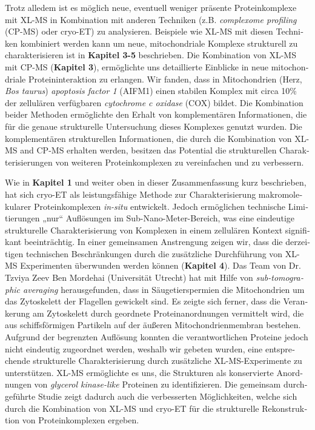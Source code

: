 \begin{otherlanguage}{german}
    Trotz alledem ist es möglich neue, eventuell weniger präsente Proteinkomplexe mit XL-MS in Kombination mit anderen Techniken (z.B. \emph{complexome profiling} (CP-MS) oder cryo-ET) zu analysieren. Beispiele wie XL-MS mit diesen Techniken kombiniert werden kann um neue, mitochondriale Komplexe strukturell zu charakterisieren ist in \textbf{Kapitel 3-5} beschrieben.
    Die Kombination von XL-MS mit CP-MS (\textbf{Kapitel 3}), ermöglichte uns detaillierte Einblicke in neue mitochondriale Proteininteraktion zu erlangen. Wir fanden, dass in Mitochondrien (Herz, \emph{Bos taurus}) \emph{apoptosis factor 1} (AIFM1) einen stabilen Komplex mit circa 10\% der zellulären verfügbaren \emph{cytochrome c oxidase} (COX) bildet. Die Kombination beider Methoden ermöglichte den Erhalt von komplementären Informationen, die für die genaue strukturelle Untersuchung dieses Komplexes genutzt wurden. Die komplementären strukturellen Informationen, die durch die Kombination von XL-MS and CP-MS erhalten werden, besitzen das Potential die strukturellen Charakterisierungen von weiteren Proteinkomplexen zu vereinfachen und zu verbessern.

    Wie in \textbf{Kapitel 1} und weiter oben in dieser Zusammenfassung kurz beschrieben, hat sich cryo-ET als leistungsfähige Methode zur Charakterisierung makromolekularer Proteinkomplexen \emph{in-situ} entwickelt. Jedoch ermöglichen technische Limitierungen „nur“ Auflösungen im Sub-Nano-Meter-Bereich, was eine eindeutige strukturelle Charakterisierung von Komplexen in einem zellulären Kontext signifikant beeinträchtig. In einer gemeinsamen Anstrengung zeigen wir, dass die derzeitigen technischen Be\-schränkungen durch die zusätzliche Durchführung von XL-MS Experimenten überwunden werden können (\textbf{Kapitel 4}). Das Team von Dr. Tzviya Zeev Ben Mordehai (Universität Utrecht) hat mit Hilfe von \emph{sub-tomographic averaging} herausgefunden, dass in Säugetierspermien die Mitochondrien um das Zytoskelett der Flagellen gewickelt sind. Es zeigte sich ferner, dass die Verankerung am Zytoskelett durch geordnete Proteinanordnungen vermittelt wird, die aus schiffsförmigen Partikeln auf der äußeren Mitochondrienmembran bestehen. Aufgrund der begrenzten Auflösung konnten die verantwortlichen Proteine jedoch nicht eindeutig zugeordnet werden, weshalb wir gebeten wurden, eine entsprechende strukturelle Charakterisierung durch zusätzliche XL-MS-Experimente zu unterstützen. XL-MS ermöglichte es uns, die Strukturen als konservierte Anordnungen von \emph{glycerol kinase-like} Proteinen zu identifizieren. Die gemeinsam durchgeführte Studie zeigt dadurch auch die verbesserten Möglich\-keiten, welche sich durch die Kombination von XL-MS und cryo-ET für die strukturelle Rekonstruktion von Proteinkomplexen ergeben.


\end{otherlanguage}
